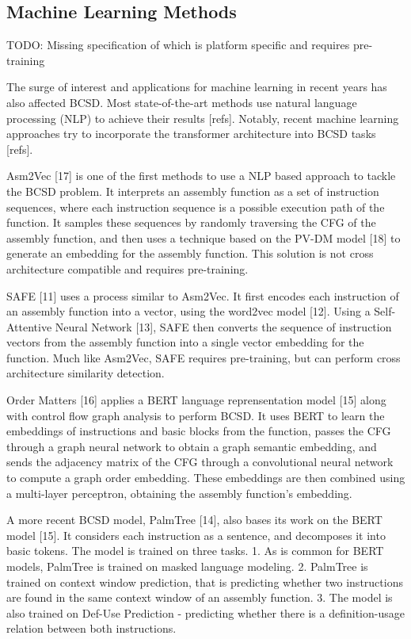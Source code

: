 \documentclass[conference,compsoc]{IEEEtran}
\begin{document}
\subsection{Machine Learning Methods}

TODO: Missing specification of which is platform specific and requires pre-training

The surge of interest and applications for machine learning in recent years has also affected BCSD.
Most state-of-the-art methods use natural language processing (NLP) to achieve their results [refs].
Notably, recent machine learning approaches try to incorporate the transformer architecture into BCSD tasks [refs].

Asm2Vec [17] is one of the first methods to use a NLP based approach to tackle the BCSD problem. It interprets an
assembly function as a set of instruction sequences, where each instruction sequence is a possible execution path
of the function. It samples these sequences by randomly traversing the CFG of the assembly function, and then
uses a technique based on the PV-DM model [18] to generate an embedding for the assembly function. This solution
is not cross architecture compatible and requires pre-training.

SAFE [11] uses a process similar to Asm2Vec. It first encodes each instruction of an assembly function into a vector,
using the word2vec model [12]. Using a Self-Attentive Neural Network [13], SAFE then converts the sequence of instruction
vectors from the assembly function into a single vector embedding for the function. Much like Asm2Vec, SAFE requires
pre-training, but can perform cross architecture similarity detection.

Order Matters [16] applies a BERT language reprensentation model [15] along with control flow graph analysis
to perform BCSD. It uses BERT to learn the embeddings of instructions and basic blocks from the function,
passes the CFG through a graph neural network to obtain a graph semantic embedding, and sends the adjacency
matrix of the CFG through a convolutional neural network to compute a graph order embedding. These embeddings
are then combined using a multi-layer perceptron, obtaining the assembly function's embedding. 

A more recent BCSD model, PalmTree [14], also bases its work on the BERT model [15].
It considers each instruction as a sentence, and decomposes it into basic tokens. The model is trained
on three tasks. 1. As is common for BERT models, PalmTree is trained on masked language modeling. 2.
PalmTree is trained on context window prediction, that is predicting whether two instructions are found
in the same context window of an assembly function. 3. The model is also trained on Def-Use Prediction -
predicting whether there is a definition-usage relation between both instructions.
\end{document}

